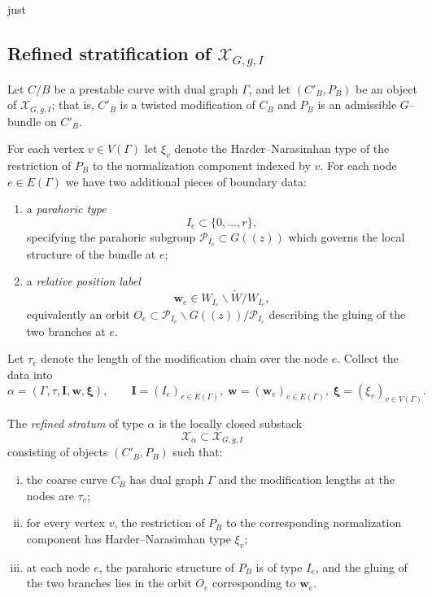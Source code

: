 just \documentclass[12pt]{article}
\begin{document}
\subsection{Refined stratification of $\mathcal X_{G,g,I}$}

Let $C/B$ be a prestable curve with dual graph $\Gamma$, and let
$(C'_B,P_B)$ be an object of $\mathcal X_{G,g,I}$; that is, $C'_B$ is a twisted
modification of $C_B$ and $P_B$ is an admissible $G$--bundle on $C'_B$.

For each vertex $v\in V(\Gamma)$ let $\xi_v$ denote the Harder--Narasimhan
type of the restriction of $P_B$ to the normalization component indexed by $v$.
For each node $e\in E(\Gamma)$ we have two additional pieces of boundary data:

\begin{enumerate}
\item a \emph{parahoric type}
      \[
        I_e\subset \{0,\dots,r\},
      \]
      specifying the parahoric subgroup
      $\mathcal P_{I_e}\subset G((z))$ which governs the local structure of
      the bundle at $e$;

\item a \emph{relative position label}
      \[
        \mathbf w_e \in
        W_{I_e}\backslash \widetilde W / W_{I_e},
      \]
      equivalently an orbit
      $O_e\subset \mathcal P_{I_e}\backslash G((z))/\mathcal P_{I_e}$
      describing the gluing of the two branches at $e$.
\end{enumerate}

Let $\tau_e$ denote the length of the modification chain over the node $e$.
Collect the data into
\[
\alpha=(\Gamma,\tau,\mathbf I,\mathbf w,\boldsymbol{\xi}),
\qquad
\mathbf I=(I_e)_{e\in E(\Gamma)},\;
\mathbf w=(\mathbf w_e)_{e\in E(\Gamma)},\;
\boldsymbol{\xi}=(\xi_v)_{v\in V(\Gamma)} .
\]

\begin{definition}
The \emph{refined stratum} of type $\alpha$ is the locally closed substack
\[
\mathcal X_\alpha \subset \mathcal X_{G,g,I}
\]
consisting of objects $(C'_B,P_B)$ such that:
\begin{enumerate}[(i)]
\item the coarse curve $C_B$ has dual graph $\Gamma$ and the modification
      lengths at the nodes are $\tau_e$;

\item for every vertex $v$, the restriction of $P_B$ to the corresponding
      normalization component has Harder--Narasimhan type $\xi_v$;

\item at each node $e$, the parahoric structure of $P_B$ is of type $I_e$,
      and the gluing of the two branches lies in the orbit $O_e$
      corresponding to $\mathbf w_e$.
\end{enumerate}
\end{definition}
\end{document}
